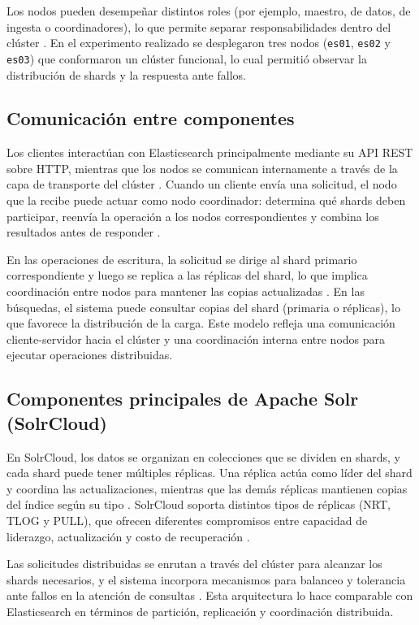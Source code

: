 \documentclass[12pt,a4paper]{article}
\begin{document}
Los nodos pueden desempeñar distintos roles (por ejemplo, maestro, de datos, de ingesta o coordinadores), lo que permite separar responsabilidades dentro del clúster \cite{elastic_nodes_shards}. En el experimento realizado se desplegaron tres nodos (\texttt{es01}, \texttt{es02} y \texttt{es03}) que conformaron un clúster funcional, lo cual permitió observar la distribución de shards y la respuesta ante fallos.

\subsection{Comunicación entre componentes}
Los clientes interactúan con Elasticsearch principalmente mediante su API REST sobre HTTP, mientras que los nodos se comunican internamente a través de la capa de transporte del clúster \cite{elastic_distributed_architecture}. Cuando un cliente envía una solicitud, el nodo que la recibe puede actuar como nodo coordinador: determina qué shards deben participar, reenvía la operación a los nodos correspondientes y combina los resultados antes de responder \cite{elastic_read_write,elastic_distributed_architecture}.

En las operaciones de escritura, la solicitud se dirige al shard primario correspondiente y luego se replica a las réplicas del shard, lo que implica coordinación entre nodos para mantener las copias actualizadas \cite{elastic_read_write}. En las búsquedas, el sistema puede consultar copias del shard (primaria o réplicas), lo que favorece la distribución de la carga. Este modelo refleja una comunicación cliente-servidor hacia el clúster y una coordinación interna entre nodos para ejecutar operaciones distribuidas.

\subsection{Componentes principales de Apache Solr (SolrCloud)}
En SolrCloud, los datos se organizan en colecciones que se dividen en shards, y cada shard puede tener múltiples réplicas. Una réplica actúa como líder del shard y coordina las actualizaciones, mientras que las demás réplicas mantienen copias del índice según su tipo \cite{solr_shards_indexing}. SolrCloud soporta distintos tipos de réplicas (NRT, TLOG y PULL), que ofrecen diferentes compromisos entre capacidad de liderazgo, actualización y costo de recuperación \cite{solr_shards_indexing,solr_recoveries}.

Las solicitudes distribuidas se enrutan a través del clúster para alcanzar los shards necesarios, y el sistema incorpora mecanismos para balanceo y tolerancia ante fallos en la atención de consultas \cite{solr_distributed_requests}. Esta arquitectura lo hace comparable con Elasticsearch en términos de partición, replicación y coordinación distribuida.
\end{document}
